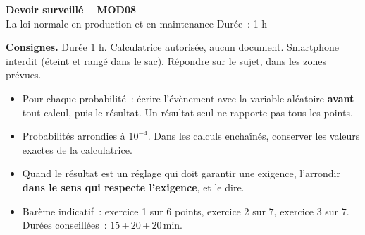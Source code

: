 \documentclass[a4paper,11pt]{article}
\begin{document}
\begin{tcolorbox}[colback=uimmred, colframe=uimmred, sharp corners, boxrule=0pt,
  left=14pt, right=14pt, top=8pt, bottom=8pt]
{\color{white}\LARGE\bfseries Devoir surveillé -- MOD08}\\[3pt]
{\color{white}\large La loi normale en production et en maintenance \hfill Durée~: 1 h}
\end{tcolorbox}

\vspace{2pt}

\begin{consigne}\small
\textbf{Consignes.} Durée $1$ h. Calculatrice autorisée, aucun document. Smartphone interdit (éteint et rangé dans le sac). Répondre sur le sujet, dans les zones prévues.
\begin{itemize}[leftmargin=12pt, itemsep=0pt, topsep=2pt]
  \item Pour chaque probabilité~: écrire l'évènement avec la variable aléatoire \textbf{avant} tout calcul, puis le résultat. Un résultat seul ne rapporte pas tous les points.
  \item Probabilités arrondies à $10^{-4}$. Dans les calculs enchaînés, conserver les valeurs exactes de la calculatrice.
  \item Quand le résultat est un réglage qui doit garantir une exigence, l'arrondir \textbf{dans le sens qui respecte l'exigence}, et le dire.
  \item Barème indicatif~: exercice 1 sur $6$ points, exercice 2 sur $7$, exercice 3 sur $7$. Durées conseillées~: $15$\,+\,$20$\,+\,$20$\,min.
\end{itemize}
\end{consigne}
\end{document}
